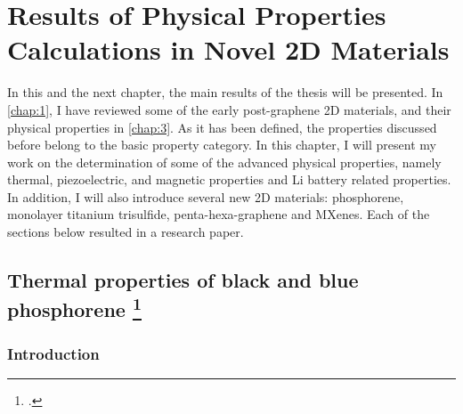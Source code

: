 
\chapter{Results of Physical Properties Calculations in Novel 2D Materials \label{chap:4}}

\ifpdf
    \graphicspath{{Chapter4/Figs/Raster/}{Chapter4/Figs/PDF/}{Chapter4/Figs/Vector/}}
\else
    \graphicspath{{Chapter4/Figs/Vector/}{Chapter4/Figs/}}
\fi


\nocite{Yimamu2012,Aierken2015.porlandite,Aierken2015.thermalP,Aierken2015.nanotubes,Menderes2015,Aierken2016.mobility,Aierken2016.pentasilicene,Aierken2016.magnetism,Aierken2017.transport,Aierken2017.battery}


In this and the next chapter, the main results of the thesis will be presented. In \autoref{chap:1}, I have reviewed some of the early post-graphene 2D materials, and their physical properties in \autoref{chap:3}. As it has been defined, the properties discussed before belong to the basic property category. In this chapter, I will present my work on the determination of some of the advanced physical properties, namely thermal, piezoelectric, and magnetic properties and Li battery related properties. In addition, I will also introduce several new 2D materials: phosphorene, monolayer titanium trisulfide, penta-hexa-graphene and MXenes. Each of the sections below resulted in a research paper. 

\section[Thermal properties of black and blue phosphorene]{Thermal properties of black and blue phosphorene \footcite[This work is published:][]{Aierken2015.thermalP} \label{thermal_phos}}


\subsection{Introduction}

